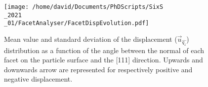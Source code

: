 \begin{figure}[!htb]
    \centering
    \texttt{[image: /home/david/Documents/PhDScripts/SixS\\\_2021\\\_01/FacetAnalyser/FacetDispEvolution.pdf]}
    \caption{
        Mean value and standard deviation of the displacement ($\vec{u}_{\hat{q_z}}$) distribution as a function of the angle between the normal of each facet on the particle surface and the [111] direction.
        Upwards and downwards arrow are represented for respectively positive and negative displacement.
    }
    \label{fig:AmaterasuDisplacement}
\end{figure}